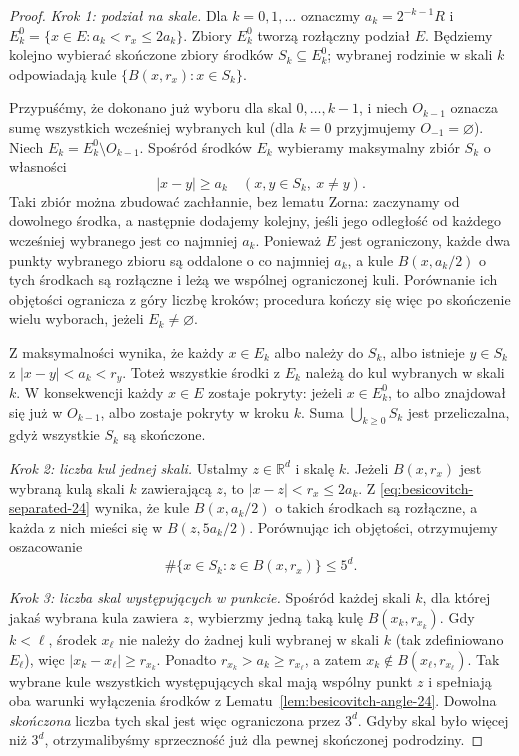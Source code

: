 \documentclass[11pt,a4paper,oneside]{book}
\numberwithin{equation}{chapter}
\theoremstyle{plain}
\theoremstyle{definition}
\theoremstyle{remark}
\begin{document}
\begin{proof}
\emph{Krok 1: podział na skale.}
Dla $k=0,1,\ldots$ oznaczmy $a_k=2^{-k-1}R$ i
$E_k^0=\{x\in E:a_k<r_x\le2a_k\}$. Zbiory
$E_k^0$ tworzą rozłączny podział $E$.
Będziemy kolejno wybierać skończone zbiory środków
$S_k\subseteq E_k^0$; wybranej rodzinie w skali $k$
odpowiadają kule $\{B(x,r_x):x\in S_k\}$.

Przypuśćmy, że dokonano już wyboru dla skal
$0,\ldots,k-1$, i niech $O_{k-1}$ oznacza sumę
wszystkich wcześniej wybranych kul (dla $k=0$
przyjmujemy $O_{-1}=\varnothing$).
Niech $E_k=E_k^0\setminus O_{k-1}$. Spośród środków
$E_k$ wybieramy maksymalny zbiór $S_k$ o własności
\begin{equation}\label{eq:besicovitch-separated-24}
 |x-y|\ge a_k\quad(x,y\in S_k,\ x\ne y).
\end{equation}
Taki zbiór można zbudować zachłannie, bez lematu
Zorna: zaczynamy od dowolnego środka, a następnie
dodajemy kolejny, jeśli jego odległość od każdego
wcześniej wybranego jest co najmniej $a_k$.
Ponieważ $E$ jest ograniczony, każde dwa punkty
wybranego zbioru są oddalone o co najmniej $a_k$,
a kule $B(x,a_k/2)$ o tych środkach są rozłączne
i leżą we wspólnej ograniczonej kuli. Porównanie
ich objętości ogranicza z góry liczbę kroków;
procedura kończy się więc po skończenie wielu
wyborach, jeżeli $E_k\ne\varnothing$.

Z maksymalności wynika, że każdy $x\in E_k$
albo należy do $S_k$, albo istnieje $y\in S_k$
z $|x-y|<a_k<r_y$. Toteż wszystkie środki z
$E_k$ należą do kul wybranych w skali $k$.
W konsekwencji każdy $x\in E$ zostaje pokryty:
jeżeli $x\in E_k^0$, to albo znajdował się już
w $O_{k-1}$, albo zostaje pokryty w kroku $k$.
Suma $\bigcup_{k\ge0}S_k$ jest przeliczalna,
gdyż wszystkie $S_k$ są skończone.

\emph{Krok 2: liczba kul jednej skali.}
Ustalmy $z\in\mathbb R^d$ i skalę $k$.
Jeżeli $B(x,r_x)$ jest wybraną kulą skali $k$
zawierającą $z$, to $|x-z|<r_x\le2a_k$.
Z \eqref{eq:besicovitch-separated-24} wynika, że
kule $B(x,a_k/2)$ o takich środkach są rozłączne,
a każda z nich mieści się w $B(z,5a_k/2)$.
Porównując ich objętości, otrzymujemy oszacowanie
\begin{equation}\label{eq:besicovitch-single-scale-24}
 \#\{x\in S_k:z\in B(x,r_x)\}\le5^d.
\end{equation}

\emph{Krok 3: liczba skal występujących w punkcie.}
Spośród każdej skali $k$, dla której jakaś wybrana
kula zawiera $z$, wybierzmy jedną taką kulę
$B(x_k,r_{x_k})$. Gdy $k<\ell$, środek
$x_\ell$ nie należy do żadnej kuli wybranej w
skali $k$ (tak zdefiniowano $E_\ell$), więc
$|x_k-x_\ell|\ge r_{x_k}$. Ponadto
$r_{x_k}>a_k\ge r_{x_\ell}$, a zatem
$x_k\notin B(x_\ell,r_{x_\ell})$.
Tak wybrane kule wszystkich występujących skal
mają wspólny punkt $z$ i spełniają oba warunki
wyłączenia środków z
Lematu~\ref{lem:besicovitch-angle-24}.
Dowolna \emph{skończona} liczba tych skal jest
więc ograniczona przez $3^d$. Gdyby skal było
więcej niż $3^d$, otrzymalibyśmy sprzeczność
już dla pewnej skończonej podrodziny.


\end{proof}
\end{document}
